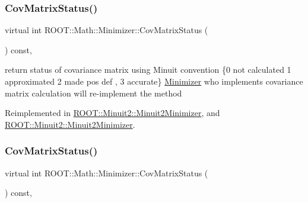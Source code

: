 \mbox{\label{classROOT_1_1Math_1_1Minimizer_a5f5eab490760ff361d9c44369e9d754d}} 
\subsubsection{\texorpdfstring{CovMatrixStatus()}{CovMatrixStatus()}\hspace{0.1cm}{\footnotesize\ttfamily [1/2]}}
{\footnotesize\ttfamily virtual int R\+O\+O\+T\+::\+Math\+::\+Minimizer\+::\+Cov\+Matrix\+Status (\begin{DoxyParamCaption}{ }\end{DoxyParamCaption}) const\hspace{0.3cm}{\ttfamily [inline]}, {\ttfamily [virtual]}}

return status of covariance matrix using Minuit convention \{0 not calculated 1 approximated 2 made pos def , 3 accurate\} \mbox{\hyperlink{classROOT_1_1Math_1_1Minimizer}{Minimizer}} who implements covariance matrix calculation will re-\/implement the method 

Reimplemented in \mbox{\hyperlink{classROOT_1_1Minuit2_1_1Minuit2Minimizer_ad9f4873b9651626d2b83cf7eab826b0f}{R\+O\+O\+T\+::\+Minuit2\+::\+Minuit2\+Minimizer}}, and \mbox{\hyperlink{classROOT_1_1Minuit2_1_1Minuit2Minimizer_ad9f4873b9651626d2b83cf7eab826b0f}{R\+O\+O\+T\+::\+Minuit2\+::\+Minuit2\+Minimizer}}.

\mbox{\label{classROOT_1_1Math_1_1Minimizer_a5f5eab490760ff361d9c44369e9d754d}} 
\subsubsection{\texorpdfstring{CovMatrixStatus()}{CovMatrixStatus()}\hspace{0.1cm}{\footnotesize\ttfamily [2/2]}}
{\footnotesize\ttfamily virtual int R\+O\+O\+T\+::\+Math\+::\+Minimizer\+::\+Cov\+Matrix\+Status (\begin{DoxyParamCaption}{ }\end{DoxyParamCaption}) const\hspace{0.3cm}{\ttfamily [inline]}, {\ttfamily [virtual]}}

